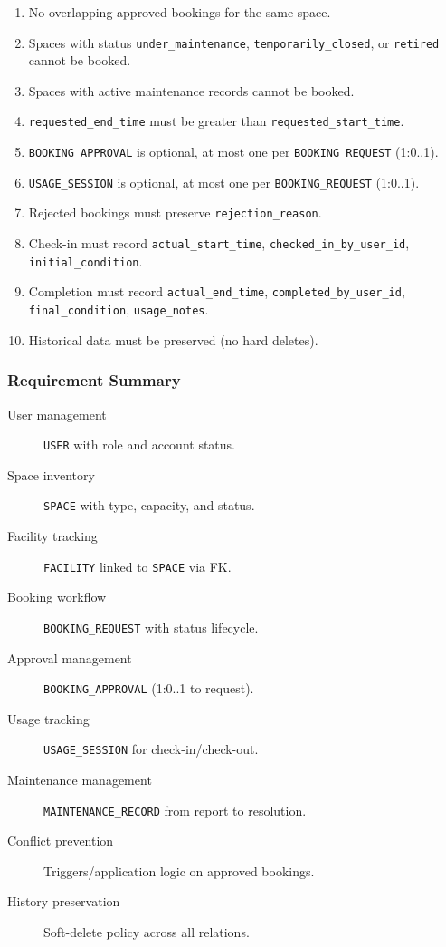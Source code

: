 \begin{enumerate}
	\item No overlapping approved bookings for the same space.
	\item Spaces with status \texttt{under\_maintenance}, \texttt{temporarily\_closed}, or \texttt{retired} cannot be booked.
	\item Spaces with active maintenance records cannot be booked.
	\item \texttt{requested\_end\_time} must be greater than \texttt{requested\_start\_time}.
	\item \texttt{BOOKING\_APPROVAL} is optional, at most one per \texttt{BOOKING\_REQUEST} (1:0..1).
	\item \texttt{USAGE\_SESSION} is optional, at most one per \texttt{BOOKING\_REQUEST} (1:0..1).
	\item Rejected bookings must preserve \texttt{rejection\_reason}.
	\item Check-in must record \texttt{actual\_start\_time}, \texttt{checked\_in\_by\_user\_id}, \\ \texttt{initial\_condition}.
	\item Completion must record \texttt{actual\_end\_time}, \texttt{completed\_by\_user\_id}, \texttt{final\_condition}, \texttt{usage\_notes}.
	\item Historical data must be preserved (no hard deletes).
\end{enumerate}

\subsubsection{Requirement Summary}

\begin{description}
	\item[User management] \texttt{USER} with role and account status.
	\item[Space inventory] \texttt{SPACE} with type, capacity, and status.
	\item[Facility tracking] \texttt{FACILITY} linked to \texttt{SPACE} via FK.
	\item[Booking workflow] \texttt{BOOKING\_REQUEST} with status lifecycle.
	\item[Approval management] \texttt{BOOKING\_APPROVAL} (1:0..1 to request).
	\item[Usage tracking] \texttt{USAGE\_SESSION} for check-in/check-out.
	\item[Maintenance management] \texttt{MAINTENANCE\_RECORD} from report to resolution.
	\item[Conflict prevention] Triggers/application logic on approved bookings.
	\item[History preservation] Soft-delete policy across all relations.
\end{description}

